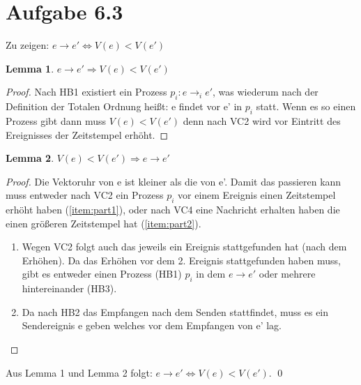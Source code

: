 \documentclass{scrartcl}
\newtheorem{lem}{Lemma}
\begin{document}
\section*{Aufgabe 6.3}
Zu zeigen: $ e \rightarrow e' \Longleftrightarrow  V(e) < V(e') $

\begin{lem}\label{lem:1}
$ e \rightarrow e' \Longrightarrow  V(e) < V(e') $
\end{lem}

\begin{proof}
Nach HB1 existiert ein Prozess $ p_{i}: e \rightarrow_{i} e' $, was wiederum nach der Definition der Totalen Ordnung heißt: e findet vor e' in $ p_{i} $ statt.
Wenn es so einen Prozess gibt dann muss $V(e) < V(e')$ denn nach VC2 wird vor Eintritt des Ereignisses der Zeitstempel erhöht.
\end{proof}

\begin{lem}\label{lem:2}
$V(e) < V(e') \Longrightarrow e \rightarrow e' $
\end{lem}

\begin{proof}
Die Vektoruhr von e ist kleiner als die von e'. Damit das passieren kann muss entweder nach VC2 ein Prozess $p_{i}$ vor einem Ereignis einen Zeitstempel erhöht haben (\ref{item:part1}), oder nach VC4 eine Nachricht erhalten haben die einen größeren Zeitstempel hat (\ref{item:part2}).
\begin{enumerate}
\item \label{item:part1} Wegen VC2 folgt auch das jeweils ein Ereignis stattgefunden hat (nach dem Erhöhen). Da das Erhöhen vor dem 2. Ereignis stattgefunden haben muss, gibt es entweder einen Prozess (HB1) $p_{i}$ in dem $e \rightarrow e'$ oder mehrere hintereinander (HB3).
\item \label{item:part2} Da nach HB2 das Empfangen nach dem Senden stattfindet, muss es ein Sendereignis e geben welches vor dem Empfangen von e' lag.
\end{enumerate}
\end{proof}

Aus Lemma 1 und Lemma 2 folgt: $ e \rightarrow e' \Longleftrightarrow  V(e) < V(e') $. \qed


%
\end{document}
